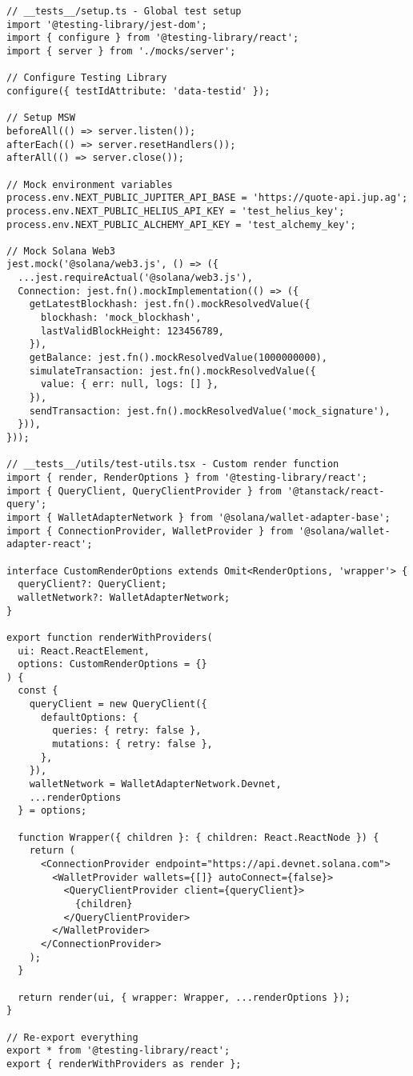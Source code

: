 \documentclass[11pt,a4paper]{article}
\begin{document}
\begin{lstlisting}[style=typescript, caption=Comprehensive Test Architecture]
// __tests__/setup.ts - Global test setup
import '@testing-library/jest-dom';
import { configure } from '@testing-library/react';
import { server } from './mocks/server';

// Configure Testing Library
configure({ testIdAttribute: 'data-testid' });

// Setup MSW
beforeAll(() => server.listen());
afterEach(() => server.resetHandlers());
afterAll(() => server.close());

// Mock environment variables
process.env.NEXT_PUBLIC_JUPITER_API_BASE = 'https://quote-api.jup.ag';
process.env.NEXT_PUBLIC_HELIUS_API_KEY = 'test_helius_key';
process.env.NEXT_PUBLIC_ALCHEMY_API_KEY = 'test_alchemy_key';

// Mock Solana Web3
jest.mock('@solana/web3.js', () => ({
  ...jest.requireActual('@solana/web3.js'),
  Connection: jest.fn().mockImplementation(() => ({
    getLatestBlockhash: jest.fn().mockResolvedValue({
      blockhash: 'mock_blockhash',
      lastValidBlockHeight: 123456789,
    }),
    getBalance: jest.fn().mockResolvedValue(1000000000),
    simulateTransaction: jest.fn().mockResolvedValue({
      value: { err: null, logs: [] },
    }),
    sendTransaction: jest.fn().mockResolvedValue('mock_signature'),
  })),
}));

// __tests__/utils/test-utils.tsx - Custom render function
import { render, RenderOptions } from '@testing-library/react';
import { QueryClient, QueryClientProvider } from '@tanstack/react-query';
import { WalletAdapterNetwork } from '@solana/wallet-adapter-base';
import { ConnectionProvider, WalletProvider } from '@solana/wallet-adapter-react';

interface CustomRenderOptions extends Omit<RenderOptions, 'wrapper'> {
  queryClient?: QueryClient;
  walletNetwork?: WalletAdapterNetwork;
}

export function renderWithProviders(
  ui: React.ReactElement,
  options: CustomRenderOptions = {}
) {
  const {
    queryClient = new QueryClient({
      defaultOptions: {
        queries: { retry: false },
        mutations: { retry: false },
      },
    }),
    walletNetwork = WalletAdapterNetwork.Devnet,
    ...renderOptions
  } = options;

  function Wrapper({ children }: { children: React.ReactNode }) {
    return (
      <ConnectionProvider endpoint="https://api.devnet.solana.com">
        <WalletProvider wallets={[]} autoConnect={false}>
          <QueryClientProvider client={queryClient}>
            {children}
          </QueryClientProvider>
        </WalletProvider>
      </ConnectionProvider>
    );
  }

  return render(ui, { wrapper: Wrapper, ...renderOptions });
}

// Re-export everything
export * from '@testing-library/react';
export { renderWithProviders as render };
\end{lstlisting}
\end{document}

